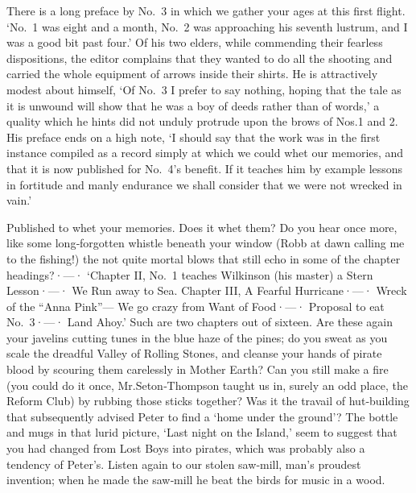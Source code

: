 There is a long preface by No.~3 in which we gather your ages at this first flight.
‘No.~1 was eight and a month,
No.~2 was approaching his seventh lustrum,
and I was a good bit past four.’
Of his two elders, while commending their fearless dispositions,
the editor complains that they wanted to do all the shooting
and carried the whole equipment of arrows inside their shirts.
He is attractively modest about himself,
‘Of No.~3 I prefer to say nothing,
hoping that the tale as it is unwound will show that he was a boy of deeds rather than of words,’
a quality which he hints did not unduly protrude upon the brows of Nos.\@ 1 and 2.
His preface ends on a high note,
‘I should say that the work was in the first instance compiled as a record
simply at which we could whet our memories,
and that it is now published for No.~4’s benefit.
If it teaches him by example lessons in fortitude and manly endurance
we shall consider that we were not wrecked in vain.’

Published to whet your memories.
Does it whet them?
Do you hear once more, like some long‐forgotten whistle beneath your window
(Robb at dawn calling me to the fishing!\@)
the not quite mortal blows that still echo in some of the chapter headings?·—·%
‘Chapter II, No.~1 teaches Wilkinson (his master) a Stern Lesson·—·%
We Run away to Sea.
Chapter III, A Fearful Hurricane·—·%
Wreck of the “Anna Pink”—%
We go crazy from Want of Food·—·%
Proposal to eat No.~3·—·%
Land Ahoy.’
Such are two chapters out of sixteen.
Are these again your javelins cutting tunes in the blue haze of the pines;
do you sweat as you scale the dreadful Valley of Rolling Stones,
and cleanse your hands of pirate blood by scouring them carelessly in Mother Earth?
Can you still make a fire
(you could do it once,
Mr.\@ Seton‐Thompson taught us in, surely an odd place, the Reform Club)
by rubbing those sticks together?
Was it the travail of hut‐building that subsequently advised Peter to find a ‘home under the ground’?
The bottle and mugs in that lurid picture, ‘Last night on the Island,’
seem to suggest that you had changed from Lost Boys into pirates,
which was probably also a tendency of Peter’s.
Listen again to our stolen saw‐mill, man’s proudest invention;
when he made the saw‐mill he beat the birds for music in a wood.

